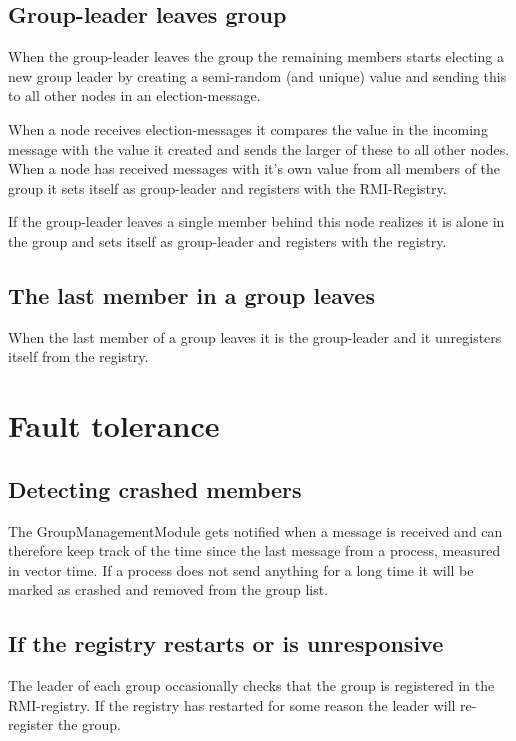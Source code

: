\documentclass[11pt,swedish]{article}
\begin{document}
\subsection{Group-leader leaves group}
When the group-leader leaves the group the remaining members starts electing a new group leader by creating a semi-random (and unique) value and sending this to all other nodes in an election-message.

When a node receives election-messages it compares the value in the incoming message with the value it created and sends the larger of these to all other nodes. When a node has received messages with it's own value from all members of the group it sets itself as group-leader and registers with the RMI-Registry.

If the group-leader leaves a single member behind this node realizes it is alone in the group and sets itself as group-leader and registers with the registry.

\subsection{The last member in a group leaves}
When the last member of a group leaves it is the group-leader and it unregisters itself from the registry.

\section{Fault tolerance}

\subsection{Detecting crashed members}
The GroupManagementModule gets notified when a message is received and can therefore keep track of the time since the last message from a process, measured in vector time. If a process does not send anything for a long time it will be marked as crashed and removed from the group list.

\subsection{If the registry restarts or is unresponsive}
The leader of each group occasionally checks that the group is registered in the RMI-registry. If the registry has restarted for some reason the leader will re-register the group.
\end{document}
